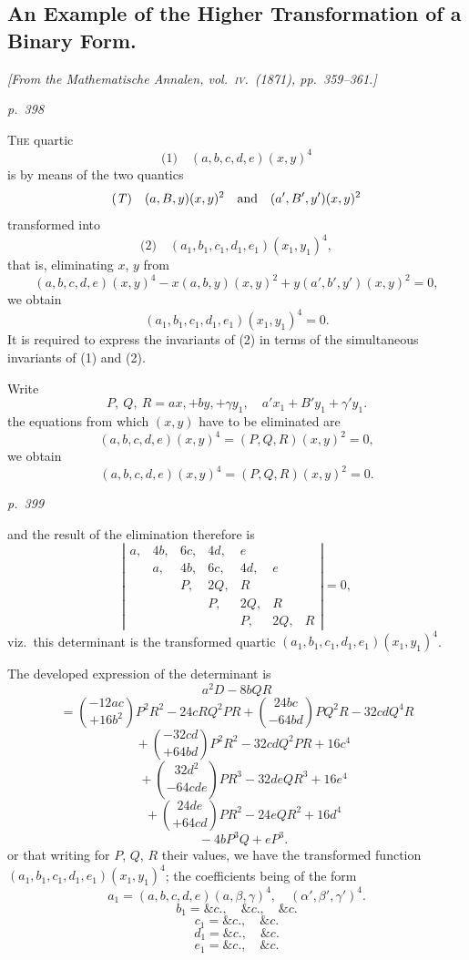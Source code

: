 \documentclass[11pt,a4paper]{book}
\begin{document}
\subsection{An Example of the Higher Transformation of a Binary Form.}

\begin{center}
\textit{[From the Mathematische Annalen, vol.~\textsc{iv}.\ (1871), pp.~359--361.]}
\end{center}

\textit{p.~398}

\noindent
\textsc{The} quartic
\[
\text{(1)}\quad (a, b, c, d, e)(x, y)^4
\]
is by means of the two quantics
\[
\text{(\textit{T})}\quad (a, B, y)(x, y)^2 \quad \text{and} \quad (a', B', y')(x, y)^2
\]
transformed into
\[
\text{(2)}\quad (a_1, b_1, c_1, d_1, e_1)(x_1, y_1)^4,
\]
that is, eliminating $x$, $y$ from
\[
(a, b, c, d, e)(x, y)^4
- x(a, b, y)(x, y)^2 + y(a', b', y')(x, y)^2 = 0,
\]
we obtain
\[
(a_1, b_1, c_1, d_1, e_1)(x_1, y_1)^4 = 0.
\]
It is required to express the invariants of (2) in terms of the simultaneous invariants
of (1) and (2).

Write
\[
P,\ Q,\ R = ax, + by, + \gamma y_1, \quad a'x_1 + B' y_1 + \gamma' y_1.
\]
the equations from which $(x, y)$ have to be eliminated are
\[
(a, b, c, d, e)(x, y)^4 = (P, Q, R)(x, y)^2 = 0,
\]
we obtain
\[
(a, b, c, d, e)(x, y)^4 = (P, Q, R)(x, y)^2 = 0.
\]

\clearpage

\bigskip
\textit{p.~399}
\smallskip

\noindent
and the result of the elimination therefore is
\[
\left|\begin{array}{cccc}
a, & 4b, & 6c, & 4d, & e \\
\, & a, & 4b, & 6c, & 4d, & e \\
\, & \, & P, & 2Q, & R \\
\, & \, & \, & P, & 2Q, & R \\
\, & \, & \, & \, & P, & 2Q, & R
\end{array}\right| = 0,
\]
viz.\ this determinant is the transformed quartic $(a_1, b_1, c_1, d_1, e_1)(x_1, y_1)^4$.

The developed expression of the determinant is
\[
a^2 D - 8 b Q R
\]
\[
= \binom{-12 a c}{+ 16 b^2} P^2 R^2 - 24 c R Q^2 P R + \binom{24 b c}{- 64 b d} P Q^2 R - 32 c d Q^4 R
\]
\[
\quad + \binom{-32 c d}{+ 64 b d} P^2 R^2 - 32 c d Q^2 P R + 16 c^4
\]
\[
\quad + \binom{32 d^2}{- 64 c d e} P R^3 - 32 d e Q R^3 + 16 e^4
\]
\[
\quad + \binom{24 d e}{+ 64 c d} P R^2 - 24 e Q R^2 + 16 d^4
\]
\[
\quad - 4 b P^3 Q + e P^3.
\]
or that writing for $P$, $Q$, $R$ their values, we have the transformed function
$(a_1, b_1, c_1, d_1, e_1)(x_1, y_1)^4$; the coefficients being of the form
\[
a_1 = (a, b, c, d, e)(a, \beta, \gamma)^4, \quad (\alpha', \beta', \gamma')^4.
\]
\[
b_1 = \&c., \quad \&c., \quad \&c.
\]
\[
c_1 = \&c., \quad \&c.
\]
\[
d_1 = \&c., \quad \&c.
\]
\[
e_1 = \&c., \quad \&c.
\]
\end{document}
